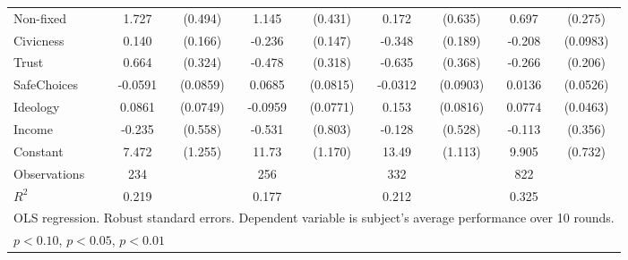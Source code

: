 {\begin{tabular}{l*{4}{cc}}
Non-fixed       &    1.727\sym{***}&  (0.494)&    1.145\sym{***}&  (0.431)&    0.172         &  (0.635)&    0.697\sym{**} &  (0.275)\\
Civicness       &    0.140         &  (0.166)&   -0.236         &  (0.147)&   -0.348\sym{*}  &  (0.189)&   -0.208\sym{**} & (0.0983)\\
Trust           &    0.664\sym{**} &  (0.324)&   -0.478         &  (0.318)&   -0.635\sym{*}  &  (0.368)&   -0.266         &  (0.206)\\
SafeChoices     &  -0.0591         & (0.0859)&   0.0685         & (0.0815)&  -0.0312         & (0.0903)&   0.0136         & (0.0526)\\
Ideology        &   0.0861         & (0.0749)&  -0.0959         & (0.0771)&    0.153\sym{*}  & (0.0816)&   0.0774\sym{*}  & (0.0463)\\
Income          &   -0.235         &  (0.558)&   -0.531         &  (0.803)&   -0.128         &  (0.528)&   -0.113         &  (0.356)\\
Constant        &    7.472\sym{***}&  (1.255)&    11.73\sym{***}&  (1.170)&    13.49\sym{***}&  (1.113)&    9.905\sym{***}&  (0.732)\\
\hline
Observations    &      234         &         &      256         &         &      332         &         &      822         &         \\
\(R^{2}\)       &    0.219         &         &    0.177         &         &    0.212         &         &    0.325         &         \\
\hline\hline
\multicolumn{9}{l}{\footnotesize OLS regression. Robust standard errors. Dependent variable is subject's average performance over 10 rounds.}\\
\multicolumn{9}{l}{\footnotesize \sym{*} \(p<0.10\), \sym{**} \(p<0.05\), \sym{***} \(p<0.01\)}\\
\end{tabular}
}
